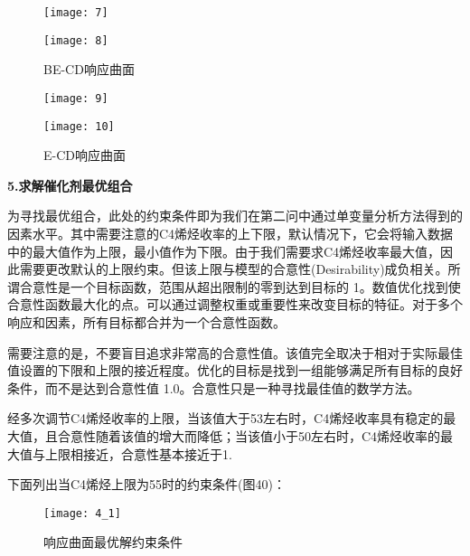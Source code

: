 \documentclass[withoutpreface,bwprint]{cumcmthesis} %
\begin{document}
\begin{figure}[!h]
	\centering
	\begin{minipage}[c]{0.45\textwidth}
		\centering
		\texttt{[image: 7]}
		\label{fig:sample-figure-a}
	\end{minipage}
	\begin{minipage}[c]{0.45\textwidth}
		\centering
		\texttt{[image: 8]}
		\label{fig:sample-figure-b}
	\end{minipage}
	\caption{BE-CD响应曲面}
	\label{fig:sample-figure}
\end{figure}


\begin{figure}[!h]
	\centering
	\begin{minipage}[c]{0.45\textwidth}
		\centering
		\texttt{[image: 9]}
		\label{fig:sample-figure-a}
	\end{minipage}
	\begin{minipage}[c]{0.45\textwidth}
		\centering
		\texttt{[image: 10]}
		\label{fig:sample-figure-b}
	\end{minipage}
	\caption{E-CD响应曲面}
	\label{fig:sample-figure}
\end{figure}

\newpage
\textbf{5.求解催化剂最优组合}

为寻找最优组合，此处的约束条件即为我们在第二问中通过单变量分析方法得到的因素水平。其中需要注意的C4烯烃收率的上下限，默认情况下，它会将输入数据中的最大值作为上限，最小值作为下限。由于我们需要求C4烯烃收率最大值，因此需要更改默认的上限约束。但该上限与模型的合意性(Desirability)成负相关。所谓合意性是一个目标函数，范围从超出限制的零到达到目标的 1。数值优化找到使合意性函数最大化的点。可以通过调整权重或重要性来改变目标的特征。对于多个响应和因素，所有目标都合并为一个合意性函数。

需要注意的是，不要盲目追求非常高的合意性值。该值完全取决于相对于实际最佳值设置的下限和上限的接近程度。优化的目标是找到一组能够满足所有目标的良好条件，而不是达到合意性值 1.0。合意性只是一种寻找最佳值的数学方法。

经多次调节C4烯烃收率的上限，当该值大于53左右时，C4烯烃收率具有稳定的最大值，且合意性随着该值的增大而降低；当该值小于50左右时，C4烯烃收率的最大值与上限相接近，合意性基本接近于1.

\newpage
下面列出当C4烯烃上限为55时的约束条件(图40)：
\begin{figure}[!h]
	\centering
	\texttt{[image: 4\_1]}
	\caption{响应曲面最优解约束条件}
	\label{fig:circuit-diagram1}
\end{figure}
\end{document}
